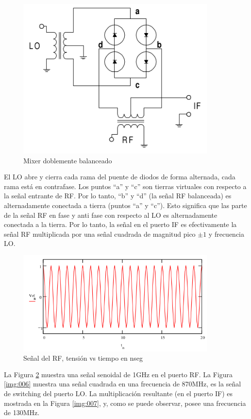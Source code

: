\documentclass[a4paper,10pt]{article}
\begin{document}
	\begin{figure}[!htb]
		\centering
		\includegraphics[width=10cm]{Images/DoubleBalancedMixer.png}
		\caption{Mixer doblemente balanceado}
		\label{img:004}
	\end{figure}

	
	\indent El LO abre y cierra cada rama del puente de diodos de
	forma alternada, cada rama está en contrafase. Los puntos ``a'' y ``c'' son 
	tierras virtuales con respecto a la señal entrante de RF. Por lo tanto, ``b'' 
	y ``d'' (la señal RF balanceada) es alternadamente conectada a tierra (puntos 
	``a'' y ``c''). Esto significa que las parte de la señal RF en fase y anti fase 
	con respecto al LO es alternadamente conectada a la tierra. Por lo tanto, la
	señal en el puerto IF es efectivamente la señal RF multiplicada por una 
	señal cuadrada de magnitud pico $\pm 1$ y frecuencia LO. \\
	
	\begin{figure}[!htb]
		\centering
		\includegraphics[width=10cm]{Images/VRF.png}
		\caption{Señal del RF, tensión vs tiempo en nseg}
		\label{img:005}
	\end{figure}

	\indent La Figura \ref{img:005} muestra una señal senoidal de 1GHz en el
	puerto RF. La Figura \ref{img:006} muestra una señal cuadrada en una 
	frecuencia de 870MHz, es la señal de switching del puerto LO. La 
	multiplicación resultante (en el puerto IF) es mostrada en la Figura 
	\ref{img:007}, y, como se puede observar, posee una frecuencia de 130MHz. \\
	
\end{document}
